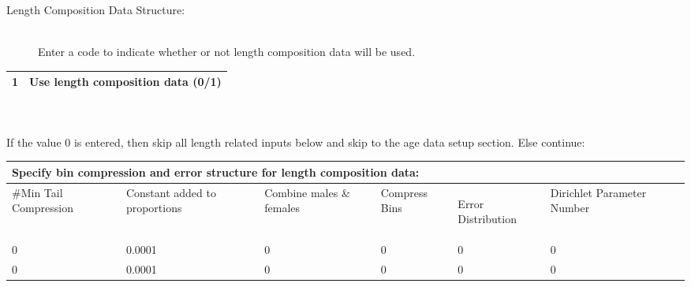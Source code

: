 \begin{description}
	\item[Length Composition Data Structure:]\
		{\\Enter a code to indicate whether or not length composition data will be used.}
\end{description}

\begin{tabular}{p{2cm} p{5cm} p{8cm}}
		\hline	
		1 & \multicolumn{2}{l}{Use length composition data (0/1)}\\
		\hline									  
\end{tabular}
\\\\If the value 0 is entered, then skip all length related inputs below and skip to the age data setup section.  Else continue:
	

\begin{tabular}{p{2cm} p{2.75cm} p{2.75cm} p{2cm} p{2cm} p{2cm} p{3.5cm}}
		\multicolumn{6}{l}{Specify bin compression and error structure for length composition data:}\\
		\hline
		\#Min Tail Compression & Constant added to proportions & Combine males \& females & Compress Bins & \hypertarget{Dirichlet}{Error Distribution} & Dirichlet Parameter Number\\
		\hline
		0 & 0.0001 & 0 & 0 & 0 & 0\\
		0 & 0.0001 & 0 & 0 & 0 & 0\\
		\hline
\end{tabular}



